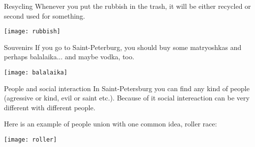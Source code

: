 \documentclass[11pt]{beamer}
\begin{document}
\begin{frame}{Resycling}
	Whenever you put the rubbish in the trash, it will be either recycled or second used for something.
	\begin{center}
	\texttt{[image: rubbish]}
	\end{center}
\end{frame}

\begin{frame}{Souvenirs}
	If you go to Saint-Peterburg, you should buy some matryoshkas and perhaps balalaika... and maybe vodka, too.
	\begin{center}
	\texttt{[image: balalaika]}
	\end{center}
\end{frame}

\begin{frame}{People and social interaction}
	In Saint-Petersburg you can find any kind of people (agressive or kind, evil or saint etc.). Because of it social intereaction can be very different with different people. 
	
	Here is an example of people union with one common idea, roller race:
	\begin{center}
	\texttt{[image: roller]}
	\end{center}
\end{frame}
\end{document}

